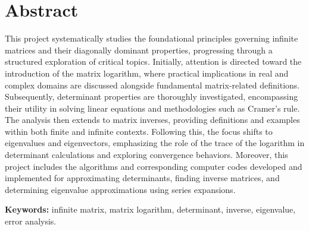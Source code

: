 \chapter*{Abstract}
This project systematically studies the foundational principles governing infinite matrices and their diagonally dominant properties, progressing through a structured exploration of critical topics. Initially, attention is directed toward the introduction of the matrix logarithm, where practical implications in real and complex domains are discussed alongside fundamental matrix-related definitions. Subsequently, determinant properties are thoroughly investigated, encompassing their utility in solving linear equations and methodologies such as Cramer’s rule. The analysis then extends to matrix inverses, providing definitions and examples within both finite and infinite contexts. Following this, the focus shifts to eigenvalues and eigenvectors, emphasizing the role of the trace of the logarithm in determinant calculations and exploring convergence behaviors. Moreover, this project includes the algorithms and corresponding computer codes developed and implemented for approximating determinants, finding inverse matrices, and determining eigenvalue approximations using series expansions.\newline

\textbf{Keywords:} infinite matrix, matrix logarithm, determinant, inverse, eigenvalue, error analysis.
